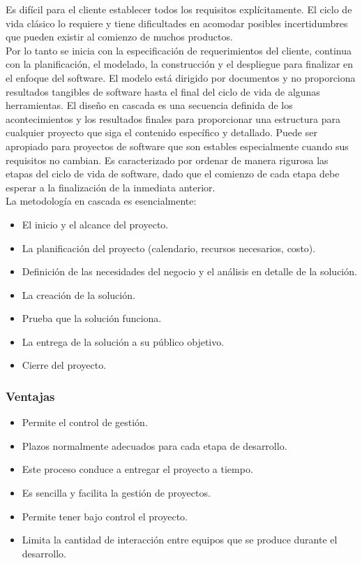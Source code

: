 	Es dif\'icil para el cliente establecer todos los requisitos expl\'icitamente. El ciclo de vida cl\'asico lo requiere y tiene dificultades en acomodar posibles incertidumbres que pueden existir al comienzo de muchos productos. \\

	Por lo tanto se inicia con la especificaci\'on de requerimientos del cliente, continua con la planificaci\'on, el modelado, la construcci\'on y el despliegue para finalizar en el enfoque del software. El modelo está dirigido por documentos y no proporciona resultados tangibles de software hasta el final del ciclo de vida de algunas herramientas. El dise\~no en cascada es una secuencia definida de los acontecimientos y los resultados finales para proporcionar una estructura para cualquier proyecto que siga el contenido espec\'ifico y detallado. Puede ser apropiado para proyectos de software que son estables especialmente cuando sus requisitos no cambian. Es caracterizado por ordenar de manera rigurosa las etapas del ciclo de vida de software, dado que el comienzo de cada etapa debe esperar a la finalizaci\'on de la inmediata anterior.\\

	La metodolog\'ia en cascada es esencialmente:
	\begin{itemize}
		\item El inicio y el alcance del proyecto.
		\item La planificaci\'on del proyecto (calendario, recursos necesarios, costo).
		\item Definici\'on de las necesidades del negocio y el an\'alisis en detalle de la soluci\'on.
		\item La creaci\'on de la soluci\'on.
		\item Prueba que la soluci\'on funciona.
		\item La entrega de la soluci\'on a su p\'ublico objetivo.
		\item Cierre del proyecto.
	\end{itemize}

	\subsubsection{Ventajas}
	\begin{itemize}
		\item Permite el control de gesti\'on.
		\item Plazos normalmente adecuados para cada etapa de desarrollo.
		\item Este proceso conduce a entregar el proyecto a tiempo.
		\item Es sencilla y facilita la gesti\'on de proyectos.
		\item Permite tener bajo control el proyecto.
		\item Limita la cantidad de interacci\'on entre equipos que se produce durante el desarrollo.
	\end{itemize}


